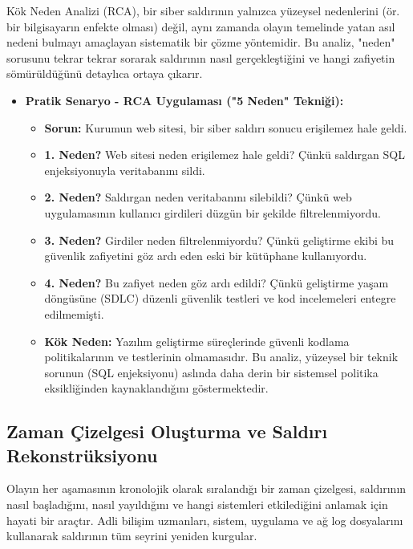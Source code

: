\begin{itemize}
Kök Neden Analizi (RCA), bir siber saldırının yalnızca yüzeysel nedenlerini (ör. bir bilgisayarın enfekte olması) değil, aynı zamanda olayın temelinde yatan asıl nedeni bulmayı amaçlayan sistematik bir çözme yöntemidir. Bu analiz, "neden" sorusunu tekrar tekrar sorarak saldırının nasıl gerçekleştiğini ve hangi zafiyetin sömürüldüğünü detaylıca ortaya çıkarır.

\begin{itemize}
    \item \textbf{Pratik Senaryo - RCA Uygulaması ("5 Neden" Tekniği):}
    \begin{itemize}
        \item \textbf{Sorun:} Kurumun web sitesi, bir siber saldırı sonucu erişilemez hale geldi.
        \item \textbf{1. Neden?} Web sitesi neden erişilemez hale geldi? Çünkü saldırgan SQL enjeksiyonuyla veritabanını sildi.
        \item \textbf{2. Neden?} Saldırgan neden veritabanını silebildi? Çünkü web uygulamasının kullanıcı girdileri düzgün bir şekilde filtrelenmiyordu.
        \item \textbf{3. Neden?} Girdiler neden filtrelenmiyordu? Çünkü geliştirme ekibi bu güvenlik zafiyetini göz ardı eden eski bir kütüphane kullanıyordu.
        \item \textbf{4. Neden?} Bu zafiyet neden göz ardı edildi? Çünkü geliştirme yaşam döngüsüne (SDLC) düzenli güvenlik testleri ve kod incelemeleri entegre edilmemişti.
        \item \textbf{Kök Neden:} Yazılım geliştirme süreçlerinde güvenli kodlama politikalarının ve testlerinin olmamasıdır. Bu analiz, yüzeysel bir teknik sorunun (SQL enjeksiyonu) aslında daha derin bir sistemsel politika eksikliğinden kaynaklandığını göstermektedir.
    \end{itemize}
\end{itemize}

\subsection{Zaman Çizelgesi Oluşturma ve Saldırı Rekonstrüksiyonu}

Olayın her aşamasının kronolojik olarak sıralandığı bir zaman çizelgesi, saldırının nasıl başladığını, nasıl yayıldığını ve hangi sistemleri etkilediğini anlamak için hayati bir araçtır. Adli bilişim uzmanları, sistem, uygulama ve ağ log dosyalarını kullanarak saldırının tüm seyrini yeniden kurgular.


\end{itemize}
